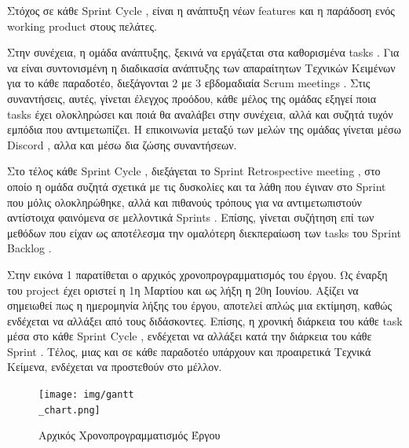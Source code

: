 \documentclass{../ol-softwaremanual}
\begin{document}
	Στόχος σε κάθε \en Sprint Cycle \gr , είναι η ανάπτυξη νέων \en features \gr και η παράδοση ενός \en working product \gr στους πελάτες. \\ 
	
	\vspace{5pt}
	
	Στην συνέχεια, η ομάδα ανάπτυξης, ξεκινά να εργάζεται στα καθορισμένα \en tasks \gr .
	Για να είναι συντονισμένη η διαδικασία ανάπτυξης των απαραίτητων Τεχνικών Κειμένων για το κάθε παραδοτέο, διεξάγονται 2 με 3 εβδομαδιαία \en Scrum meetings \gr . Στις συναντήσεις, αυτές, γίνεται έλεγχος προόδου, κάθε μέλος της ομάδας εξηγεί ποια \en tasks \gr έχει ολοκληρώσει και ποιά θα αναλάβει στην συνέχεια, αλλά και συζητά τυχόν εμπόδια που αντιμετωπίζει.
	Η επικοινωνία μεταξύ των μελών της ομάδας γίνεται μέσω \en Discord \gr, αλλα και μέσω δια ζώσης συναντήσεων. \\
	
	\vspace{5pt}
	
	Στο τέλος κάθε \en Sprint Cycle \gr , διεξάγεται το \en Sprint Retrospective meeting \gr , στο οποίο η ομάδα συζητά σχετικά με τις δυσκολίες και τα λάθη που έγιναν στο \en Sprint \gr που μόλις ολοκληρώθηκε, αλλά και πιθανούς τρόπους για να αντιμετωπιστούν αντίστοιχα φαινόμενα σε μελλοντικά \en Sprints \gr . Επίσης, γίνεται συζήτηση επί των μεθόδων που είχαν ως αποτέλεσμα την ομαλότερη διεκπεραίωση των \en tasks \gr του \en Sprint Backlog \gr .
	
	\newpage
	
		
		\flushleft
		
		Στην εικόνα 1 παρατίθεται ο αρχικός χρονοπρογραμματισμός του έργου. Ως έναρξη του \en project \gr έχει οριστεί η 1η Μαρτίου και ως λήξη η 20η Ιουνίου. Αξίζει να σημειωθεί πως η ημερομηνία λήξης του έργου, αποτελεί απλώς μια εκτίμηση, καθώς ενδέχεται να αλλάξει από τους διδάσκοντες. Επίσης, η χρονική διάρκεια του κάθε \en task \gr μέσα στο κάθε \en Sprint Cycle \gr, ενδέχεται να αλλάξει κατά την διάρκεια του κάθε \en Sprint \gr . Τέλος, μιας και σε κάθε παραδοτέο υπάρχουν και προαιρετικά Τεχνικά Κείμενα, ενδέχεται να προστεθούν στο μέλλον.
	
	
		\begin{figure}[htbp!]
			
			\texttt{[image: img/gantt\\\_chart.png]}
			\caption{Αρχικός Χρονοπρογραμματισμός Έργου}
			
			
		\end{figure}
	
\end{document}

